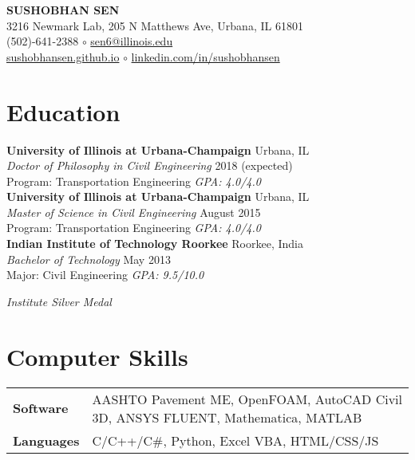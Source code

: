 \documentclass[12pt]{article}
\begin{document}
 \sloppy
\begin{center}
{\large \uppercase{\textbf{Sushobhan Sen}}} \\
3216 Newmark Lab, 205 N Matthews Ave, Urbana, IL 61801 \\
(502)-641-2388 $\circ$ \href{mailto:sen6@illinois.edu}{sen6@illinois.edu} \\
\href{http://sushobhansen.github.io/}{sushobhansen.github.io} $\circ$ \href{http://linkedin.com/in/sushobhansen}{linkedin.com/in/sushobhansen}
\end{center} 

\hfill \break
\section*{Education}
\textbf{University of Illinois at Urbana-Champaign} \hfill Urbana, IL\\
\textit{Doctor of Philosophy in Civil Engineering} \hfill 2018 (expected)\\
Program: Transportation Engineering \hfill \textit{GPA: 4.0/4.0} \\

\textbf{University of Illinois at Urbana-Champaign} \hfill Urbana, IL\\
\textit{Master of Science in Civil Engineering} \hfill August 2015\\
Program: Transportation Engineering \hfill \textit{GPA: 4.0/4.0} \\

\textbf{Indian Institute of Technology Roorkee} \hfill Roorkee, India\\
\textit{Bachelor of Technology} \hfill May 2013\\
Major: Civil Engineering \hfill \textit{GPA: 9.5/10.0} \\
\strut \hfill \textit{Institute Silver Medal} \\

\section*{Computer Skills}
\begin{tabular}{p{10em} p{25em}}
\textbf{Software} & AASHTO Pavement ME, OpenFOAM, AutoCAD Civil 3D, ANSYS FLUENT, Mathematica, MATLAB \\
\textbf{Languages} & C/C++/C\#, Python, Excel VBA, HTML/CSS/JS
\end{tabular}
\end{document}
